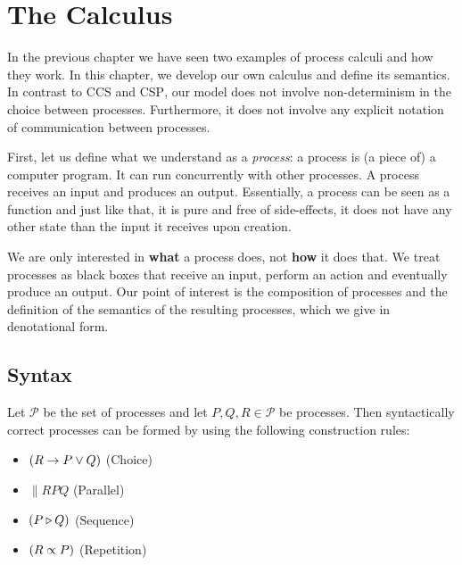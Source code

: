 \chapter{The Calculus}
\label{chp:algebraic_model}
\label{chp:calculus}
In the previous chapter we have seen two examples of process calculi and how they work. In this chapter, we develop our own calculus and define its semantics. In contrast to \textsc{CCS} and \textsc{CSP}, our model does not involve non-determinism in the choice between processes. Furthermore, it does not involve any explicit notation of communication between processes.

First, let us define what we understand as a \textit{process}: a process is (a piece of) a computer program. It can run concurrently with other processes. A process receives an input and produces an output. Essentially, a process can be seen as a function and just like that, it is pure and free of side-effects, it does not have any other state than the input it receives upon creation.

We are only interested in \textbf{what} a process does, not \textbf{how} it does that. We treat processes as black boxes that receive an input, perform an action and eventually produce an output. Our point of interest is the composition of processes and the definition of the semantics of the resulting processes, which we give in denotational form.

\section{Syntax}
\label{chp:syntax}
Let $\mathcal{P}$ be the set of processes and let $P, Q, R \in \mathcal{P}$ be processes. Then syntactically correct processes can be formed by using the following construction rules:
\begin{itemize}
  \item $\left( R \to P \vee Q \right)$ \hspace*{2.3em} (Choice)
  \item $\parallel{R}{P}{Q}$ \hspace*{2.8em} (Parallel)
  \item $\left( P \triangleright Q \right)$ \hspace*{4.8em} (Sequence)
  \item $\left( R \propto P \right)$ \hspace*{4.4em} (Repetition)
\end{itemize}

